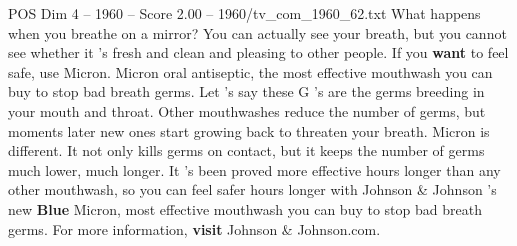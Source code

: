 \begin{textsample}{POS Dim 4 – 1960 – Score 2.00 – 1960/tv\_com\_1960\_62.txt}  \label{ex:f4_pos_011}
What happens when you breathe on a mirror?
You can actually see your breath, but you cannot see whether it 's fresh and clean and pleasing to other people.
If you \textbf{want} to feel safe, use Micron.
Micron oral antiseptic, the most effective mouthwash you can buy to stop bad breath germs.
Let 's say these G 's are the germs breeding in your mouth and throat.
Other mouthwashes reduce the number of germs, but moments later new ones start growing back to threaten your breath.
Micron is different.
It not only kills germs on contact, but it keeps the number of germs much lower, much longer.
It 's been proved more effective hours longer than any other mouthwash, so you can feel safer hours longer with Johnson \& Johnson 's new \textbf{Blue} Micron, most effective mouthwash you can buy to stop bad breath germs.
For more information, \textbf{visit} Johnson \& Johnson.com.

\end{textsample}
